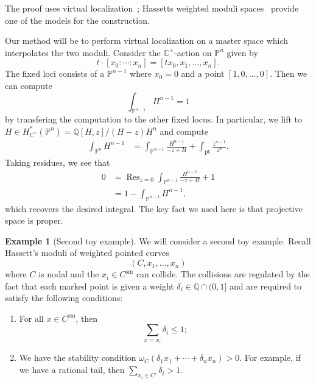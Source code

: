 \documentclass{amsart}
\theoremstyle{definition}
\newtheorem{exm}[thm]{Example}
\theoremstyle{remark}
\theoremstyle{plain}
\theoremstyle{definition}
\theoremstyle{remark}
\newcommand{\C}{\mathbb{C}}
\newcommand{\Q}{\mathbb{Q}}
\renewcommand{\P}{\mathbb{P}}
\newcommand{\mr}[1]{\mathrm{#1}}
\newcommand{\on}[1]{\operatorname{#1}}
\newcommand{\1}{\mathbf{1}}
\newcommand{\2}{\mathbf{2}}
\newcommand{\3}{\mathbf{3}}
\begin{document}
The proof uses virtual localization~\cite{GP1999}; Hassett\textquotesingle s weighted moduli spaces~\cite{Hassett2003} provide one of the models for the construction.

Our method will be to perform virtual localization on a master space which interpolates the two moduli. Consider the \(\C^{\times}\)-action on \(\P^n\) given by
\[ t \cdot [x_0 : \cdots : x_n] = [t x_0, x_1, \ldots, x_n]. \]
The fixed loci consists of a \(\P^{n-1}\) where \(x_0 = 0\) and a point \([1, 0, \ldots, 0]\). Then we can compute
\[ \int_{\P^{n-1}} H^{n-1} = 1 \]
by transfering the computation to the other fixed locus. In particular, we lift to \(H \in H_{\C^{\times}}^* (\P^n) = \Q[H,z] / (H-z)H^n\) and compute
\begin{align*}
    \int_{\P^n} H^{n-1} &= \int_{\P^{n-1}} \frac{H^{n-1}}{-z+H} + \int_{\mr{pt}} \frac{z^{n-1}}{z^n}.
\end{align*}
Taking residues, we see that
\begin{align*}
    0 &= \on{Res}_{z = 0}\int_{\P^{n-1}} \frac{H^{n-1}}{-z+H} + 1 \\
    &= 1 - \int_{\P^{n-1}}H^{n-1},
\end{align*}
which recovers the desired integral. The key fact we used here is that projective space is proper.

\begin{exm}[Second toy example]
    We will consider a second toy example. Recall Hassett's moduli of weighted pointed curves
    \[ (C, x_1, \ldots, x_n) \]
    where \(C\) is nodal and the \(x_i \in C^{\mr{sm}}\) can collide. The collisions are regulated by the fact that each marked point is given a weight \(\delta_i \in \Q \cap (0,1]\) and are required to satisfy the following conditions:
    \begin{enumerate}
        \item For all \(x \in C^{\mr{sm}}\), then
            \[ \sum_{x = x_i} \delta_i \leq 1; \]
        \item We have the stability condition \(\omega_C(\delta_1 x_1 + \cdots + \delta_n x_n) > 0\). For example, if we have a rational tail, then \(\sum_{x_i \in C'} \delta_i > 1\).
    \end{enumerate}
\end{exm}
\end{document}
